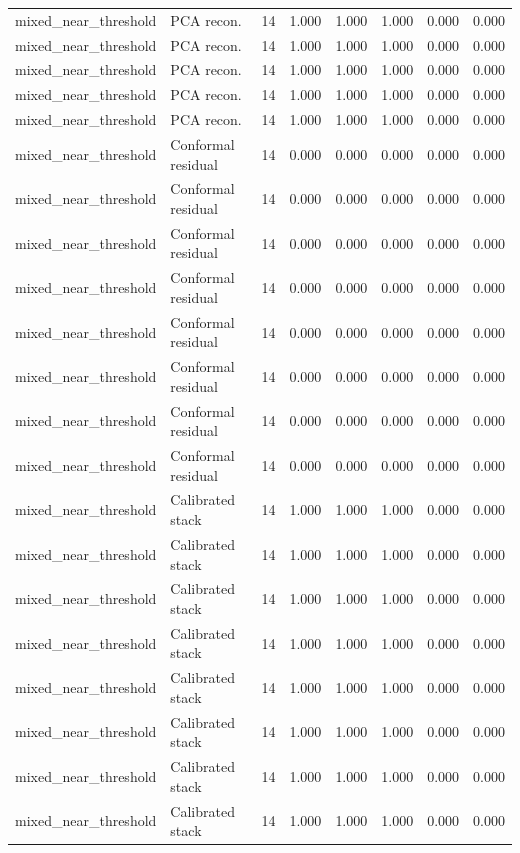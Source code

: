 {\begin{longtable}{llrrrrrr}
mixed\_near\_threshold & PCA recon. & 14 & 1.000 & 1.000 & 1.000 & 0.000 & 0.000 \\
mixed\_near\_threshold & PCA recon. & 14 & 1.000 & 1.000 & 1.000 & 0.000 & 0.000 \\
mixed\_near\_threshold & PCA recon. & 14 & 1.000 & 1.000 & 1.000 & 0.000 & 0.000 \\
mixed\_near\_threshold & PCA recon. & 14 & 1.000 & 1.000 & 1.000 & 0.000 & 0.000 \\
mixed\_near\_threshold & PCA recon. & 14 & 1.000 & 1.000 & 1.000 & 0.000 & 0.000 \\
mixed\_near\_threshold & Conformal residual & 14 & 0.000 & 0.000 & 0.000 & 0.000 & 0.000 \\
mixed\_near\_threshold & Conformal residual & 14 & 0.000 & 0.000 & 0.000 & 0.000 & 0.000 \\
mixed\_near\_threshold & Conformal residual & 14 & 0.000 & 0.000 & 0.000 & 0.000 & 0.000 \\
mixed\_near\_threshold & Conformal residual & 14 & 0.000 & 0.000 & 0.000 & 0.000 & 0.000 \\
mixed\_near\_threshold & Conformal residual & 14 & 0.000 & 0.000 & 0.000 & 0.000 & 0.000 \\
mixed\_near\_threshold & Conformal residual & 14 & 0.000 & 0.000 & 0.000 & 0.000 & 0.000 \\
mixed\_near\_threshold & Conformal residual & 14 & 0.000 & 0.000 & 0.000 & 0.000 & 0.000 \\
mixed\_near\_threshold & Conformal residual & 14 & 0.000 & 0.000 & 0.000 & 0.000 & 0.000 \\
mixed\_near\_threshold & Calibrated stack & 14 & 1.000 & 1.000 & 1.000 & 0.000 & 0.000 \\
mixed\_near\_threshold & Calibrated stack & 14 & 1.000 & 1.000 & 1.000 & 0.000 & 0.000 \\
mixed\_near\_threshold & Calibrated stack & 14 & 1.000 & 1.000 & 1.000 & 0.000 & 0.000 \\
mixed\_near\_threshold & Calibrated stack & 14 & 1.000 & 1.000 & 1.000 & 0.000 & 0.000 \\
mixed\_near\_threshold & Calibrated stack & 14 & 1.000 & 1.000 & 1.000 & 0.000 & 0.000 \\
mixed\_near\_threshold & Calibrated stack & 14 & 1.000 & 1.000 & 1.000 & 0.000 & 0.000 \\
mixed\_near\_threshold & Calibrated stack & 14 & 1.000 & 1.000 & 1.000 & 0.000 & 0.000 \\
mixed\_near\_threshold & Calibrated stack & 14 & 1.000 & 1.000 & 1.000 & 0.000 & 0.000 \\

\end{longtable}}
